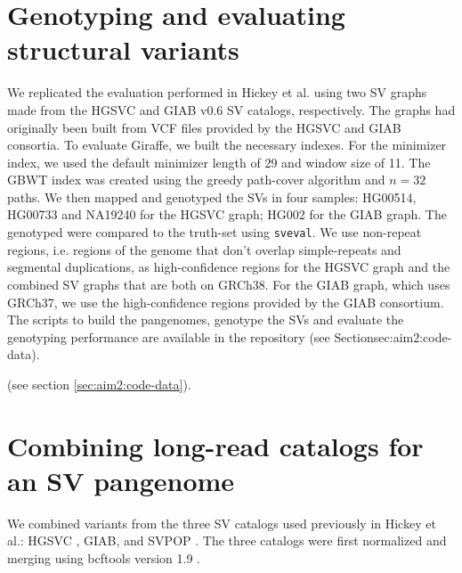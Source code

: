 \documentclass[11pt]{ucscthesis}
\begin{document}
\section{Genotyping and evaluating structural variants}
\label{subsec:aim2:svgenotyping}

We replicated the evaluation performed in Hickey et al.\cite{hickey_vgsv_2020} using two SV graphs made from the HGSVC\cite{chaisson_sv_2019} and GIAB v0.6\cite{zook_robust_2020} SV catalogs, respectively.
The graphs had originally been built from VCF files provided by the HGSVC and GIAB consortia.
To evaluate Giraffe, we built the necessary indexes.
For the minimizer index, we used the default minimizer length of 29 and window size of 11.
The GBWT index was created using the greedy path-cover algorithm and $n = 32$ paths.
We then mapped and genotyped the SVs in four samples: HG00514, HG00733 and NA19240 for the HGSVC graph; HG002 for the GIAB graph.
The genotyped were compared to the truth-set using \texttt{sveval}\cite{hickey_vgsv_2020}.
We use non-repeat regions, i.e. regions of the genome that don't overlap simple-repeats and segmental duplications, as high-confidence regions for the HGSVC graph and the combined SV graphs that are both on GRCh38.
For the GIAB graph, which uses GRCh37, we use the high-confidence regions provided by the GIAB consortium\cite{zook_robust_2020}.
The scripts to build the pangenomes, genotype the SVs and evaluate the genotyping performance are available in the repository (see Section{sec:aim2:code-data}).

(see section \ref{sec:aim2:code-data}).

\section{Combining long-read catalogs for an SV pangenome}
\label{subsec:svpangenome}

We combined variants from the three SV catalogs used previously in Hickey et al.\cite{hickey_vgsv_2020}: HGSVC \cite{chaisson_sv_2019}, GIAB\cite{zook_robust_2020}, and SVPOP \cite{audano_hgsvc}.
The three catalogs were first normalized and merging using bcftools version 1.9 \cite{li_samtools_2011}.
\end{document}
